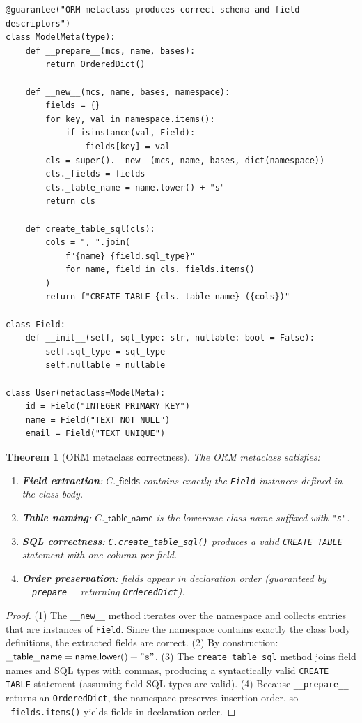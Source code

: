 \documentclass[11pt,a4paper]{report}
\theoremstyle{definition}
\theoremstyle{plain}
\newtheorem{theorem}[definition]{Theorem}
\begin{document}
\begin{lstlisting}[style=synhopy]
@guarantee("ORM metaclass produces correct schema and field descriptors")
class ModelMeta(type):
    def __prepare__(mcs, name, bases):
        return OrderedDict()

    def __new__(mcs, name, bases, namespace):
        fields = {}
        for key, val in namespace.items():
            if isinstance(val, Field):
                fields[key] = val
        cls = super().__new__(mcs, name, bases, dict(namespace))
        cls._fields = fields
        cls._table_name = name.lower() + "s"
        return cls

    def create_table_sql(cls):
        cols = ", ".join(
            f"{name} {field.sql_type}"
            for name, field in cls._fields.items()
        )
        return f"CREATE TABLE {cls._table_name} ({cols})"

class Field:
    def __init__(self, sql_type: str, nullable: bool = False):
        self.sql_type = sql_type
        self.nullable = nullable

class User(metaclass=ModelMeta):
    id = Field("INTEGER PRIMARY KEY")
    name = Field("TEXT NOT NULL")
    email = Field("TEXT UNIQUE")
\end{lstlisting}

\begin{theorem}[ORM metaclass correctness]
\label{thm:orm-metaclass}
The ORM metaclass satisfies:
\begin{enumerate}
  \item \textbf{Field extraction}: $C.\mathsf{\_fields}$ contains exactly the
    \lstinline[style=python]{Field} instances defined in the class body.
  \item \textbf{Table naming}: $C.\mathsf{\_table\_name}$ is the lowercase
    class name suffixed with \texttt{"s"}.
  \item \textbf{SQL correctness}: \lstinline[style=python]{C.create_table_sql()}
    produces a valid \texttt{CREATE TABLE} statement with one column per field.
  \item \textbf{Order preservation}: fields appear in declaration order
    (guaranteed by \lstinline[style=python]{__prepare__} returning
    \lstinline[style=python]{OrderedDict}).
\end{enumerate}
\end{theorem}
\begin{proof}
(1) The \lstinline[style=python]{__new__} method iterates over the namespace
and collects entries that are instances of \lstinline[style=python]{Field}.
Since the namespace contains exactly the class body definitions, the
extracted fields are correct.
(2) By construction: $\mathsf{\_table\_name} = \mathsf{name.lower()} + \mathtt{"s"}$.
(3) The \texttt{create\_table\_sql} method joins field names and SQL types
with commas, producing a syntactically valid \texttt{CREATE TABLE} statement
(assuming field SQL types are valid).
(4) Because \lstinline[style=python]{__prepare__} returns an
\lstinline[style=python]{OrderedDict}, the namespace preserves insertion
order, so \texttt{\_fields.items()} yields fields in declaration order.
\end{proof}
\end{document}
